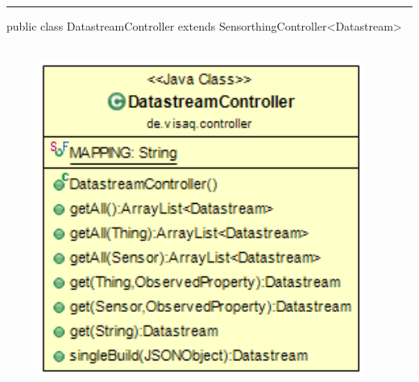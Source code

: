 \rule{\textwidth}{0.4pt}
public class DatastreamController extends SensorthingController<Datastream>
\\\\
\begin{minipage}{0.3\textwidth}
    \begin{figure}[H]
        {\centering\includegraphics[width=0.95\textwidth]{media/backend/controller/classes/DatastreamController.png}}
    \end{figure}
    \end{minipage} \hfill
\begin{minipage}{0.7\textwidth}
\end{minipage}

